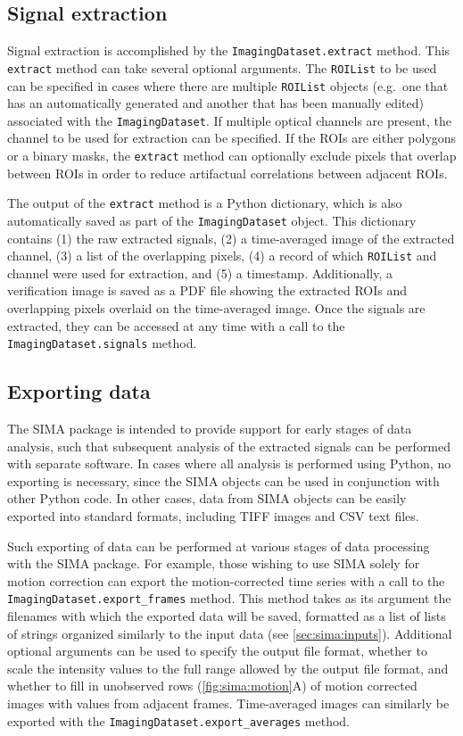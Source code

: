 \subsection{Signal extraction}
Signal extraction is accomplished by the \verb|ImagingDataset.extract| method.
This \verb|extract| method can take several optional arguments.
The \verb|ROIList| to be used can be specified in cases where there are multiple
\verb|ROIList| objects (e.g.\ one that has an automatically generated and another
that has been manually edited) associated with the \verb|ImagingDataset|.
If multiple optical channels are present, the channel to be used for extraction can be
specified.
If the ROIs are either polygons or a binary masks, 
the \verb|extract| method can optionally exclude pixels that overlap between ROIs in 
order to reduce artifactual correlations between adjacent ROIs.

The output of the \verb|extract| method is a Python dictionary, which is
also automatically saved as part of the \verb|ImagingDataset| object.
This dictionary contains
(1) the raw extracted signals, 
(2) a time-averaged image of the extracted channel,
(3) a list of the overlapping pixels,
(4) a record of which \verb|ROIList| and channel were used for extraction, and
(5) a timestamp.
Additionally, a verification image is saved as a PDF file showing the extracted ROIs
and overlapping pixels overlaid on the time-averaged image.
Once the signals are extracted, they can be accessed at any time with a call to the
\verb|ImagingDataset.signals| method.

\subsection{Exporting data}
The SIMA package is intended to provide support for early stages of data analysis,
such that subsequent analysis of the extracted signals can be performed with separate software.
In cases where all analysis is performed using Python, no exporting is necessary,
since the SIMA objects can be used in conjunction with other Python code.
In other cases, data from SIMA objects can be easily exported into standard formats,
including TIFF images and CSV text files.

Such exporting of data can be performed at various stages of data processing
with the SIMA package.
For example, those wishing to use SIMA solely for motion correction can export the
motion-corrected time series with a call to the \verb|ImagingDataset.export_frames| method.
This method takes as its argument the filenames with which the exported data
will be saved,
formatted as a list of lists of strings organized similarly to the input data
(see \autoref{sec:sima:inputs}).
Additional optional arguments can be used to specify the output file format,
whether to scale the intensity values to the full range allowed by the output file format,
and whether to fill in unobserved rows (\autoref{fig:sima:motion}A) of motion corrected images with values
from adjacent frames.
Time-averaged images can similarly be exported with the \verb|ImagingDataset.export_averages|
method.

